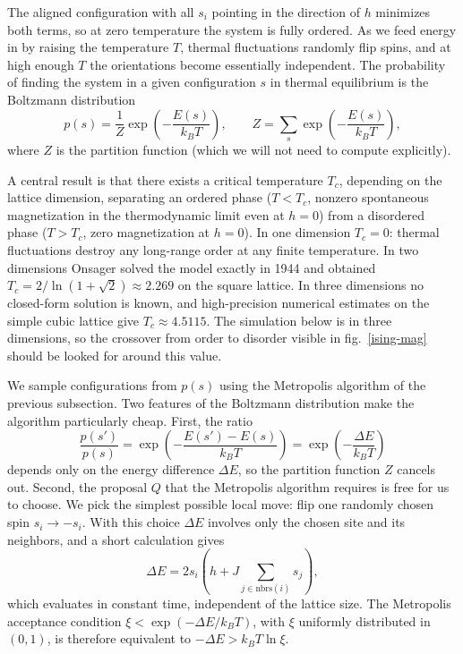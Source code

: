 \documentclass[justified, sixbynine]{tufte-book}
\theoremstyle{plain}%
\newtheorem * {corollary}{Corollary}
\theoremstyle{definition}
\theoremstyle{remark}
\newtheorem * {remark}{Remark}
\newtheorem * {note}{Note}
\begin{document}
\begin{fullwidth}
The aligned configuration with all $s_i$ pointing in the direction of $h$ minimizes both terms, so at zero temperature the system is fully ordered. As we feed energy in by raising the temperature $T$, thermal fluctuations randomly flip spins, and at high enough $T$ the orientations become essentially independent. The probability of finding the system in a given configuration $s$ in thermal equilibrium is the Boltzmann distribution
\begin{equation}
p(s) = \frac{1}{Z} \exp\!\left(-\frac{E(s)}{k_B T}\right), \qquad Z = \sum_s \exp\!\left(-\frac{E(s)}{k_B T}\right),
\end{equation}
where $Z$ is the partition function (which we will not need to compute explicitly).

A central result is that there exists a critical temperature $T_c$, depending on the lattice dimension, separating an ordered phase ($T < T_c$, nonzero spontaneous magnetization in the thermodynamic limit even at $h = 0$) from a disordered phase ($T > T_c$, zero magnetization at $h = 0$). In one dimension $T_c = 0$: thermal fluctuations destroy any long-range order at any finite temperature. In two dimensions Onsager solved the model exactly in 1944 and obtained $T_c = 2 / \ln(1 + \sqrt{2}) \approx 2.269$ on the square lattice. In three dimensions no closed-form solution is known, and high-precision numerical estimates on the simple cubic lattice give $T_c \approx 4.5115$. The simulation below is in three dimensions, so the crossover from order to disorder visible in fig.~\ref{ising-mag} should be looked for around this value.

We sample configurations from $p(s)$ using the Metropolis algorithm of the previous subsection. Two features of the Boltzmann distribution make the algorithm particularly cheap. First, the ratio
\begin{equation}
\frac{p(s')}{p(s)} = \exp\!\left(-\frac{E(s') - E(s)}{k_B T}\right) = \exp\!\left(-\frac{\Delta E}{k_B T}\right)
\end{equation}
depends only on the energy difference $\Delta E$, so the partition function $Z$ cancels out. Second, the proposal $Q$ that the Metropolis algorithm requires is free for us to choose. We pick the simplest possible local move: flip one randomly chosen spin $s_i \to -s_i$. With this choice $\Delta E$ involves only the chosen site and its neighbors, and a short calculation gives
\begin{equation}
\Delta E = 2 s_i \left( h + J \sum_{j \in \mathrm{nbrs}(i)} s_j \right),
\label{eq:ising-de}
\end{equation}
which evaluates in constant time, independent of the lattice size. The Metropolis acceptance condition $\xi < \exp(-\Delta E / k_B T)$, with $\xi$ uniformly distributed in $(0, 1)$, is therefore equivalent to $-\Delta E > k_B T \ln \xi$.


\end{fullwidth}
\end{document}
